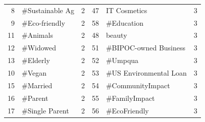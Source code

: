 \begin{longtable}{|r|l|l|r|l|l|}
    8                                 & \#Sustainable Ag                   & 2                                                       & 47                               & IT Cosmetics                        & 3                                                      \\
    9                                 & \#Eco-friendly                     & 2                                                       & 58                               & \#Education                         & 3                                                      \\
    11                                & \#Animals                          & 2                                                       & 48                               & beauty                              & 3                                                      \\
    12                                & \#Widowed                          & 2                                                       & 51                               & \#BIPOC-owned Business              & 3                                                      \\
    13                                & \#Elderly                          & 2                                                       & 52                               & \#Umpqua                            & 3                                                      \\
    10                                & \#Vegan                            & 2                                                       & 53                               & \#US Environmental Loan             & 3                                                      \\
    15                                & \#Married                          & 2                                                       & 54                               & \#CommunityImpact                   & 3                                                      \\
    16                                & \#Parent                           & 2                                                       & 55                               & \#FamilyImpact                      & 3                                                      \\
    17                                & \#Single Parent                    & 2                                                       & 56                               & \#EcoFriendly                       & 3                                                      \\

\end{longtable}
